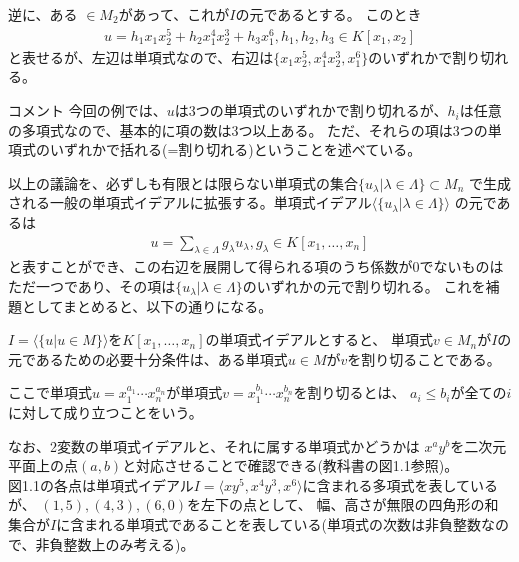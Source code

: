 \begin{frame}
	逆に、ある $\in M_2$があって、これが$I$の元であるとする。
	このとき
	\begin{align*}
		u = h_1 x_1 x_2^5 + h_2 x_1^4 x_2^3 + h_3 x_1^6, h_1, h_2, h_3 \in K[x_1, x_2]
	\end{align*}
	と表せるが、左辺は単項式なので、右辺は$\{ x_1 x_2^5, x_1^4 x_2^3, x_1^6 \}$のいずれかで割り切れる。
	\begin{block} {コメント}
		今回の例では、$u$は3つの単項式のいずれかで割り切れるが、$h_i$は任意の多項式なので、基本的に項の数は3つ以上ある。
		ただ、それらの項は3つの単項式のいずれかで括れる(=割り切れる)ということを述べている。
	\end{block}
\end{frame}

\begin{frame}
	以上の議論を、必ずしも有限とは限らない単項式の集合$\{ u_{\lambda} | \lambda \in \Lambda \} \subset M_n$
	で生成される一般の単項式イデアルに拡張する。単項式イデアル$\langle \{ u_{\lambda} | \lambda \in \Lambda \} \rangle$
	の元であるは
	\begin{align*}
		u = \sum_{\lambda \in \Lambda} g_{\lambda} u_{\lambda}, g_{\lambda} \in K[x_1, \ldots, x_n]
	\end{align*}
	と表すことができ、この右辺を展開して得られる項のうち係数が0でないものはただ一つであり、その項は$\{ u_{\lambda} | \lambda \in \Lambda \}$のいずれかの元で割り切れる。
	これを補題としてまとめると、以下の通りになる。
	\begin{lemma}
		\label{lem:single_monomial}
		$I = \langle \{u | u \in M\} \rangle$を$K[x_1, \ldots, x_n]$の単項式イデアルとすると、
		単項式$v \in M_n$が$I$の元であるための必要十分条件は、ある単項式$u \in M$が$v$を割り切ることである。
	\end{lemma}
	ここで単項式$u=x_1^{a_1} \cdots x_n^{a_n}$が単項式$v=x_1^{b_1} \cdots x_n^{b_n}$を割り切るとは、
	$a_i \leq b_i$が全ての$i$に対して成り立つことをいう。

\end{frame}

\begin{frame}
	なお、2変数の単項式イデアルと、それに属する単項式かどうかは
	$x^a y^b$を二次元平面上の点$(a, b)$と対応させることで確認できる(教科書の図1.1参照)。\\
	図1.1の各点は単項式イデアル$I = \langle xy^5, x^4y^3, x^6 \rangle$に含まれる多項式を表しているが、
	$(1,5), (4,3), (6,0)$を左下の点として、
	幅、高さが無限の四角形の和集合が$I$に含まれる単項式であることを表している(単項式の次数は非負整数なので、非負整数上のみ考える)。
\end{frame}

